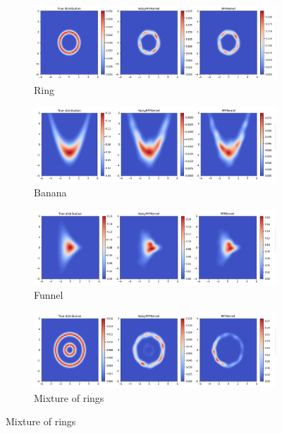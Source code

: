 \begin{figure}[H]
    \centering
    \begin{subfigure}[b]{0.8\textwidth}
        \includegraphics[width=\textwidth]{figures/score_matching/2D/ring1000MOG.png}
        \caption{Ring}
    \end{subfigure}

    \begin{subfigure}[b]{0.8\textwidth}
        \includegraphics[width=\textwidth]{figures/score_matching/2D/Banana1000.png}
        \caption{Banana}
    \end{subfigure}

    \begin{subfigure}[b]{0.8\textwidth}
        \includegraphics[width=\textwidth]{figures/score_matching/2D/Funnel1000.png}
        \caption{Funnel}
    \end{subfigure}

    \begin{subfigure}[b]{0.8\textwidth}
        \includegraphics[width=\textwidth]{figures/score_matching/2D/Rings1000.png}
        \caption{Mixture of rings}
    \end{subfigure}


\end{figure}
